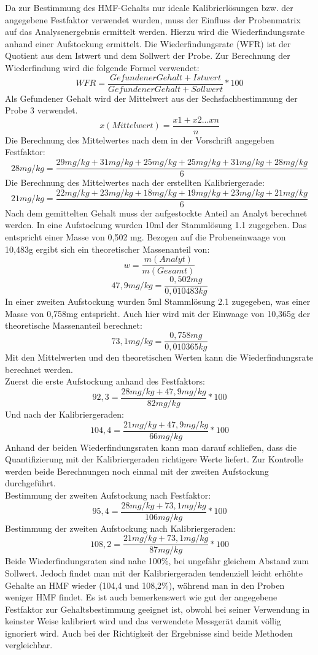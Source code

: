 Da zur Bestimmung des HMF-Gehalts nur ideale Kalibrierlösungen bzw. der angegebene Festfaktor verwendet wurden, muss der Einfluss der Probenmatrix auf das Analysenergebnis ermittelt werden. Hierzu wird die Wiederfindungsrate anhand einer Aufstockung ermittelt. Die Wiederfindungsrate (WFR) ist der Quotient aus dem Istwert und dem Sollwert der Probe. Zur Berechnung der Wiederfindung wird die folgende Formel verwendet:
    \[WFR=\frac{ Gefundener Gehalt + Istwert }{ Gefundener Gehalt + Sollwert } *100 \]
Als Gefundener Gehalt wird der Mittelwert aus der Sechsfachbestimmung der Probe 3 verwendet.
    \[x(Mittelwert)=\frac{ x1+x2...xn }{ n } \]
Die Berechnung des Mittelwertes nach dem in der Vorschrift angegeben Festfaktor:
    \[28mg/kg=\frac{ 29mg/kg+31mg/kg+25mg/kg+25mg/kg+31mg/kg+28mg/kg }{ 6 } \]
Die Berechnung des Mittelwertes nach der erstellten Kalibriergerade:
    \[21mg/kg=\frac{ 22mg/kg+23mg/kg+18mg/kg+19mg/kg+23mg/kg+21mg/kg }{ 6 } \]
Nach dem gemittelten Gehalt muss der aufgestockte Anteil an Analyt berechnet werden. In eine Aufstockung wurden 10ml der Stammlösung 1.1 zugegeben. Das entspricht einer Masse von 0,502 mg. Bezogen auf die Probeneinwaage von 10,483g ergibt sich ein theoretischer Massenanteil von:
    \[w=\frac{ m(Analyt) }{ m(Gesamt) } \]
    \[47,9mg/kg=\frac{ 0,502mg }{ 0,010483kg } \]
In einer zweiten Aufstockung wurden 5ml Stammlösung 2.1 zugegeben, was einer Masse von 0,758mg entspricht. Auch hier wird mit der Einwaage von 10,365g der theoretische Massenanteil berechnet:
    \[73,1mg/kg=\frac{ 0,758mg }{ 0,010365kg } \]
Mit den Mittelwerten und den theoretischen Werten kann die Wiederfindungsrate berechnet werden.\\
Zuerst die erste Aufstockung anhand des Festfaktors:
    \[92,3=\frac{ 28mg/kg + 47,9mg/kg }{ 82mg/kg } *100 \]
Und nach der Kalibriergeraden:
    \[104,4=\frac{ 21mg/kg + 47,9mg/kg }{ 66mg/kg } *100 \]
Anhand der beiden Wiederfindungsraten kann man darauf schließen, dass die Quantifizierung mit der Kalibriergeraden richtigere Werte liefert. Zur Kontrolle werden beide Berechnungen noch einmal mit der zweiten Aufstockung durchgeführt.\\
Bestimmung der zweiten Aufstockung nach Festfaktor:
    \[95,4=\frac{ 28mg/kg + 73,1mg/kg }{ 106mg/kg } *100 \]
Bestimmung der zweiten Aufstockung nach Kalibriergeraden:
    \[108,2=\frac{ 21mg/kg + 73,1mg/kg }{ 87mg/kg } *100 \]
Beide Wiederfindungsraten sind nahe 100\%, bei ungefähr gleichem Abstand zum Sollwert. Jedoch findet man mit der Kalibriergeraden tendenziell leicht erhöhte Gehalte an HMF wieder (104,4 und 108,2\%), während man in den Proben weniger HMF findet. Es ist auch bemerkenswert wie gut der angegebene Festfaktor zur Gehaltsbestimmung geeignet ist, obwohl bei seiner Verwendung in keinster Weise kalibriert wird und das verwendete Messgerät damit völlig ignoriert wird. Auch bei der Richtigkeit der Ergebnisse sind beide Methoden vergleichbar.
